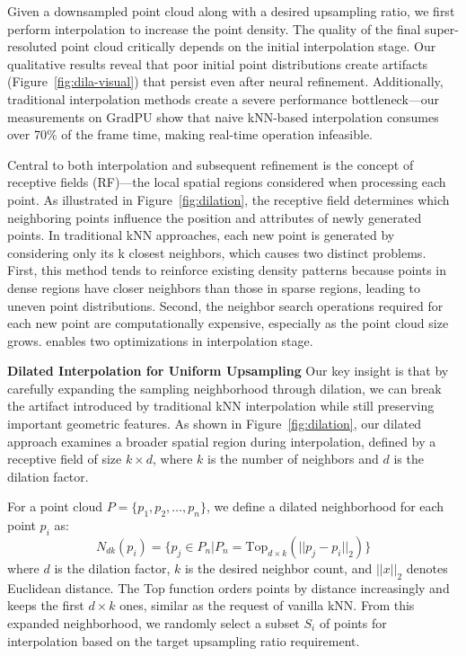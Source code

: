 \label{sec:inter}

Given a downsampled point cloud along with a desired upsampling ratio, we first perform interpolation to increase the point density.
The quality of the final super-resoluted point cloud critically depends on the initial interpolation stage. Our qualitative results reveal that poor initial point distributions create artifacts (Figure~\ref{fig:dila-visual}) that persist even after neural refinement. Additionally, traditional interpolation methods create a severe performance bottleneck—our measurements on GradPU show that naive kNN-based interpolation consumes over 70\% of the frame time, making real-time operation infeasible.

Central to both interpolation and subsequent refinement is the concept of receptive fields (RF)—the local spatial regions considered when processing each point. As illustrated in Figure~\ref{fig:dilation}, the receptive field determines which neighboring points influence the position and attributes of newly generated points. In traditional kNN approaches, each new point is generated by considering only its k closest neighbors, which causes two distinct problems. First, this method tends to reinforce existing density patterns because points in dense regions have closer neighbors than those in sparse regions, leading to uneven point distributions. Second, the neighbor search operations required for each new point are computationally expensive, especially as the point cloud size grows.
\name enables two optimizations in interpolation stage.

\noindent \textbf{Dilated Interpolation for Uniform Upsampling}
 Our key insight is that by carefully expanding the sampling neighborhood through dilation, we can break the artifact introduced by traditional kNN interpolation while still preserving important geometric features. As shown in Figure~\ref{fig:dilation}, our dilated approach examines a broader spatial region during interpolation, defined by a receptive field of size $k \times d$, where $k$ is the number of neighbors and $d$ is the dilation factor.

For a point cloud $P = \{p_1, p_2, \ldots, p_n\}$, we define a dilated neighborhood for each point $p_i$ as:
\begin{equation}
N_{dk}(p_i) = \{p_j \in P_{n} | P_{n} = \text{Top}_{d \times k}(||p_j - p_i||_2) \}
\end{equation}
where $d$ is the dilation factor, $k$ is the desired neighbor count, and $||x||_2$ denotes Euclidean distance. The Top function orders points by distance increasingly and keeps the first $d \times k$ ones, similar as the request of vanilla kNN. From this expanded neighborhood, we randomly select a subset $S_i$ of points for interpolation based on the target upsampling ratio requirement. 

